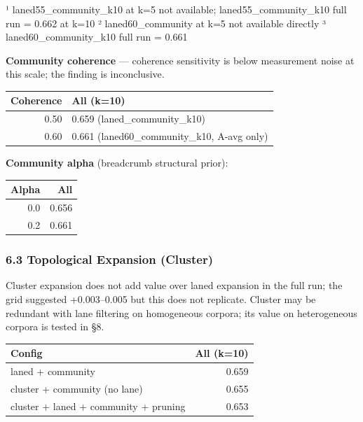 \documentclass[
]{article}
\begin{document}
¹ laned55\_community\_k10 at k=5 not available; laned55\_community\_k10
full run = 0.662 at k=10 ² laned60\_community at k=5 not available
directly ³ laned60\_community\_k10 full run = 0.661

\textbf{Community coherence} --- coherence sensitivity is below
measurement noise at this scale; the finding is inconclusive.

\begin{small}
\setlength{\tabcolsep}{4pt}
\begin{longtable}{rp{3.5in}}
\toprule
\textbf{Coherence} & \textbf{All (k=10)} \\
\midrule
\endhead
0.50 & 0.659 (laned\_community\_k10) \\
0.60 & 0.661 (laned60\_community\_k10, A-avg only) \\
\bottomrule
\end{longtable}
\end{small}

\textbf{Community alpha} (breadcrumb structural prior):

\begin{small}
\setlength{\tabcolsep}{4pt}
\begin{longtable}{rr}
\toprule
\textbf{Alpha} & \textbf{All} \\
\midrule
\endhead
0.0 & 0.656 \\
0.2 & 0.661 \\
\bottomrule
\end{longtable}
\end{small}

\subsubsection{6.3 Topological Expansion
(Cluster)}\label{topological-expansion-cluster}

Cluster expansion does not add value over laned expansion in the full
run; the grid suggested +0.003--0.005 but this does not replicate.
Cluster may be redundant with lane filtering on homogeneous corpora; its
value on heterogeneous corpora is tested in §8.

\begin{small}
\setlength{\tabcolsep}{4pt}
\begin{longtable}{p{3.0in}r}
\toprule
\textbf{Config} & \textbf{All (k=10)} \\
\midrule
\endhead
laned + community & 0.659 \\
cluster + community (no lane) & 0.655 \\
cluster + laned + community + pruning & 0.653 \\
\bottomrule
\end{longtable}
\end{small}
\end{document}

